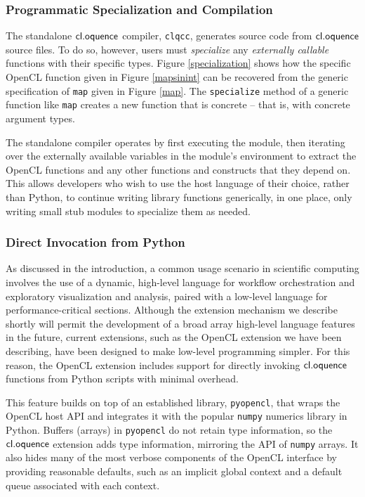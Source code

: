 \documentclass[10pt, conference, compsocconf]{IEEEtran}
\begin{document}
\subsubsection{Programmatic Specialization and Compilation}
The standalone $\textsf{cl.oquence}$ compiler, \verb|clqcc|, generates source code from $\textsf{cl.oquence}$ source files. To do so, however, users must {\it specialize} any {\it externally callable} functions with their specific types. Figure \ref{specialization} shows how the specific OpenCL function given in Figure \ref{mapsinint} can be recovered from the generic specification of \verb|map| given in Figure \ref{map}. The \verb|specialize| method of a generic function like \verb|map| creates a new function that is concrete -- that is, with concrete argument types.

The standalone compiler operates by first executing the module, then iterating over the externally available variables in the module's environment to extract the OpenCL functions and any other functions and constructs that they depend on. This allows developers who wish to use the host language of their choice, rather than Python, to continue writing library functions generically, in one place, only writing small stub modules to specialize them as needed.

\subsubsection{Direct Invocation from Python}\label{direct}
As discussed in the introduction, a common usage scenario in scientific computing involves the use of a dynamic, high-level language for workflow orchestration and exploratory visualization and analysis, paired with a low-level language for performance-critical sections. Although the extension mechanism we describe shortly will permit the development of a broad array high-level language features in the future, current extensions, such as the OpenCL extension we have been describing, have been designed to make low-level programming simpler. For this reason, the OpenCL extension includes support for directly invoking $\textsf{cl.oquence}$ functions from Python scripts with minimal overhead.

This feature builds on top of an established library, \verb|pyopencl|, that wraps the OpenCL host API and integrates it with the popular \verb|numpy| numerics library in Python. Buffers (arrays) in \verb|pyopencl| do not retain type information, so the $\textsf{cl.oquence}$ extension adds type information, mirroring the API of \verb|numpy| arrays. It also hides many of the most verbose components of the OpenCL interface by providing reasonable defaults, such as an implicit global context and a default queue associated with each context. 
\end{document}
